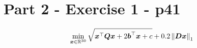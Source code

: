 \section{Part 2 - Exercise 1 - p41}
%
\begin{equation*}
    \min_{\boldsymbol x \in \mathbb{R}^{30}} \sqrt{\boldsymbol x^\top \boldsymbol{Qx} + 
    2 \boldsymbol b^\top \boldsymbol x + c} + 0.2 \left\lVert\boldsymbol{Dx}\right\rVert_{1}
\end{equation*}
%
